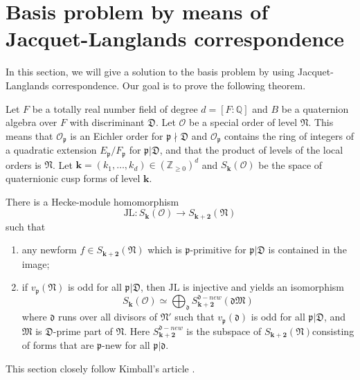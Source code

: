 \section{Basis problem by means of Jacquet-Langlands correspondence}
In this section, we will give a solution to the basis problem by using Jacquet-Langlands correspondence.
Our goal is to prove the following theorem.
\begin{theorem}
    Let $F$ be a totally real number field of degree $d = [F:\mathbb{Q}]$ and $B$ be a quaternion algebra over $F$ with discriminant $\mathfrak{D}$.
    Let $\mathcal{O}$ be a special order of level $\mathfrak{N}$.
    This means that $\mathcal{O}_{\mathfrak{p}}$ is an Eichler order for $\mathfrak{p}\nmid \mathfrak{D}$
    and $\mathcal{O}_{\mathfrak{p}}$ contains the ring of integers of a quadratic extension
    $E_{\mathfrak{p}} / F_{\mathfrak{p}}$ for $\mathfrak{p} | \mathfrak{D}$, 
    and that the product of levels of the local orders is $\mathfrak{N}$.
    Let $\mathbf{k} = (k_{1}, \dots, k_{d}) \in (\mathbb{Z}_{\geq 0})^{d}$ and $S_{\mathbf{k}}(\mathcal{O})$
    be the space of quaternionic cusp forms of level $\mathbf{k}$.

    There is a Hecke-module homomorphism 
    $$\mathrm{JL}: S_{\mathbf{k}}(\mathcal{O}) \to S_{\mathbf{k} + \mathbf{2}}(\mathfrak{N})$$
    such that 
    \begin{enumerate}
        \item any newform $f \in S_{\mathbf{k} + \mathbf{2}}(\mathfrak{N})$ which is $\mathfrak{p}$-primitive 
        for $\mathfrak{p}|\mathfrak{D}$ is contained in the image;
        \item if $v_{\mathfrak{p}}(\mathfrak{N})$ is odd for all $\mathfrak{p}|\mathfrak{D}$,
        then $\mathrm{JL}$ is injective and yields an isomorphism
        $$
            S_{\mathbf{k}}(\mathcal{O}) \simeq \bigoplus_{\mathfrak{d}} S_{\mathbf{k} + \mathbf{2}}^{\mathfrak{d}- new}(\mathfrak{dM})
        $$
        where $\mathfrak{d}$ runs over all divisors of $\mathfrak{N}'$ such that $v_{\mathfrak{p}}(\mathfrak{d})$ 
        is odd for all $\mathfrak{p} | \mathfrak{D}$, and $\mathfrak{M}$ is $\mathfrak{D}$-prime part of $\mathfrak{N}$.
        Here $S_{\mathbf{k} + \mathbf{2}}^{\mathfrak{d}-new}$ is the subspace of $S_{\mathbf{k} + \mathbf{2}}(\mathfrak{N})$consisting of forms that are $\mathfrak{p}$-new
        for all $\mathfrak{p} | \mathfrak{d}$.
    \end{enumerate}

\end{theorem}
This section closely follow Kimball's article \cite{martin2020basis}.
